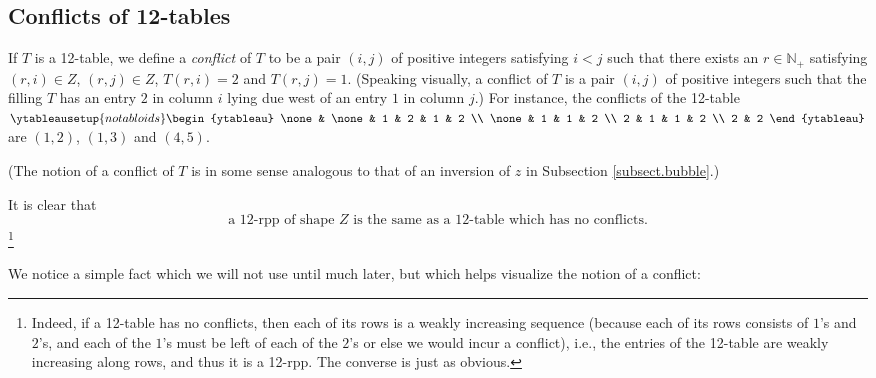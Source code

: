 \documentclass[numbers=enddot,12pt,final,onecolumn,notitlepage]{scrartcl}%
\theoremstyle{definition}
\begin{document}
\subsection{Conflicts of 12-tables}

If $T$ is a 12-table, we define a \textit{conflict} of $T$ to be a pair
$\left(  i,j\right)  $ of positive integers satisfying $i<j$ such that there
exists an $r\in\mathbb{N}_{+}$ satisfying $\left(  r,i\right)  \in Z$,
$\left(  r,j\right)  \in Z$, $T\left(  r,i\right)  =2$ and $T\left(
r,j\right)  =1$. (Speaking visually, a conflict of $T$ is a pair $\left(
i,j\right)  $ of positive integers such that the filling $T$ has an entry $2$
in column $i$ lying due west of an entry $1$ in column $j$.) For instance, the
conflicts of the 12-table $%
\ytableausetup{notabloids}
\begin{ytableau}
\none& \none& 1 & 2 & 1 & 2 \\
\none& 1 & 1 & 2 \\
2 & 1 & 1 & 2 \\
2 & 2
\end{ytableau}%
$ are $\left(  1,2\right)  $, $\left(  1,3\right)  $ and $\left(  4,5\right)
$.

(The notion of a conflict of $T$ is in some sense analogous to that of an
inversion of $z$ in Subsection \ref{subsect.bubble}.)

It is clear that%
\begin{equation}
\text{a 12-rpp of shape }Z\text{ is the same as a 12-table which has no
conflicts.} \label{pf.lem.BK.no-conflicts}%
\end{equation}
\footnote{Indeed, if a 12-table has no conflicts, then each of its rows is a
weakly increasing sequence (because each of its rows consists of $1$'s and
$2$'s, and each of the $1$'s must be left of each of the $2$'s or else we
would incur a conflict), i.e., the entries of the 12-table are weakly
increasing along rows, and thus it is a 12-rpp. The converse is just as
obvious.}

We notice a simple fact which we will not use until much later, but which
helps visualize the notion of a conflict:
\end{document}
